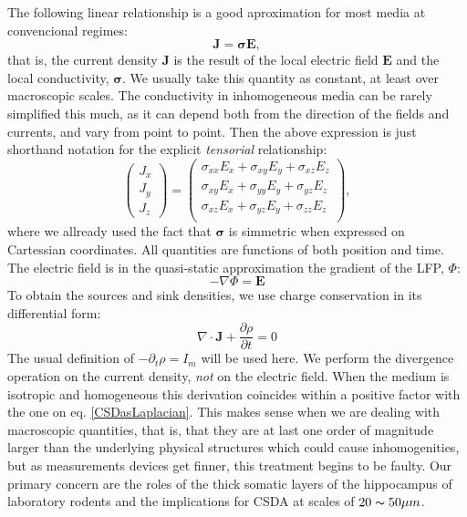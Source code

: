 \documentclass{article}
\newcommand{\Jd}{\mathbf{J}}
\newcommand{\EF}{\mathbf{E}}
\newcommand{\cond}{\boldsymbol{\sigma}}
\begin{document}
The following linear relationship is a good aproximation for
most media at convencional regimes: 
\begin{equation}
\Jd=\cond \EF,
\end{equation}
that is, the current density $\Jd$ is the result of the
local electric field $\EF$ and the local conductivity, $\cond$.
We usually take this quantity as constant, 
at least over macroscopic scales.
The conductivity in inhomogeneous media can be rarely
simplified this much, as it can depend both from the direction
of the fields and currents, and vary from point to point. 
Then the above expression is just shorthand notation for the
explicit  \emph{tensorial} relationship:
\begin{equation}
  \begin{pmatrix}
    J_x \\
    J_y \\
    J_z
  \end{pmatrix}
  =
   \begin{pmatrix}
     \sigma_{xx}E_x+ \sigma_{xy}E_y+\sigma_{xz}E_z \\
     \sigma_{xy}E_x+ \sigma_{yy}E_y+\sigma_{yz}E_z \\
     \sigma_{xz}E_x+ \sigma_{yz}E_y+\sigma_{zz}E_z \\
  \end{pmatrix},
\end{equation}
where we allready used the fact that $\cond$ is simmetric when
expressed on Cartessian coordinates. All quantities are functions of
both position and time.
The electric field is in the quasi-static approximation the
gradient of the LFP, $\Phi$:
\begin{equation}
  -\nabla \Phi=\EF
\end{equation}
To obtain the sources and sink densities, we use charge conservation in
its differential form:
\begin{equation}
\nabla \cdot \Jd +\frac{\partial \rho}{\partial t}=0
\end{equation}
The usual definition of $-\partial_t \rho =I_m$ will be used here. 
We perform the divergence operation on the current density, \emph{not}
on the electric field. When the medium is isotropic and homogeneous
this derivation coincides within a positive factor with the one
on eq. \ref{CSDasLaplacian}.
This makes sense when we are dealing with macroscopic quantities,
that is, that they are at last one order of magnitude larger
than the underlying physical structures which could cause 
inhomogenities, but as measurements devices get finner,
this treatment begins to be faulty. 
Our primary concern are the roles of the thick somatic layers of
the hippocampus of laboratory rodents and the implications for
CSDA at scales of $20 \thicksim 50 \mu m$. 
\end{document}
